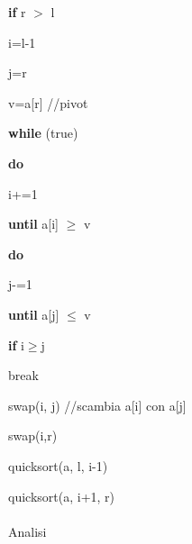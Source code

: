 \documentclass[12pt,a4paper]{book}
\begin{document}
\textbf{if} r $>$ l

\hspace{2em} i=l-1

\hspace{2em} j=r

\hspace{2em} v=a[r] //pivot

\hspace{2em} \textbf{while} (true)

\hspace{2em} \hspace{2em} \textbf{do}

\hspace{2em} \hspace{2em} \hspace{2em} i+=1

\hspace{2em} \hspace{2em} \textbf{until} a[i] $\geq$ v

\hspace{2em} \hspace{2em} \textbf{do}

\hspace{2em} \hspace{2em} \hspace{2em} j-=1

\hspace{2em} \hspace{2em} \textbf{until}  a[j] $\leq$ v

\hspace{2em} \hspace{2em} \textbf{if} i$\geq$j

\hspace{2em} \hspace{2em} \hspace{2em} break

\hspace{2em} \hspace{2em} swap(i, j) //scambia a[i] con a[j]

\hspace{2em} swap(i,r)

\hspace{2em} quicksort(a, l, i-1)

\hspace{2em} quicksort(a, i+1, r)
      
      
\paragraph{}Analisi
\end{document}
